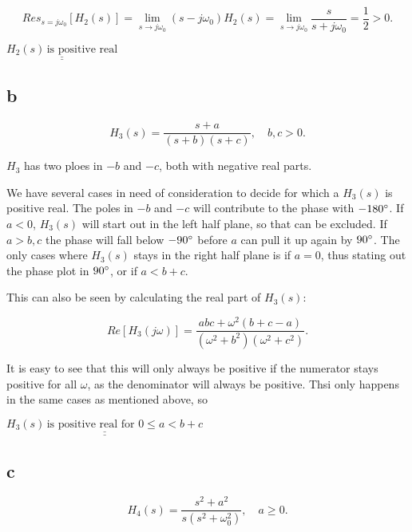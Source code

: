 \documentclass{article}
\begin{document}
\begin{equation*}
    Res_{s = j\omega_0}[H_2(s)] = \lim_{s\to j\omega_0}(s - j\omega_0)H_2(s) = \lim_{s\to j\omega_0}\frac{s}{s + j\omega_0} = \frac{1}{2} > 0.
\end{equation*}

$\underline{\underline{H_2(s) \, \textrm{is positive real}}}$


\subsection*{b}

\begin{equation*}
    H_3(s) = \frac{s+a}{(s + b)(s + c)}, \quad b, c > 0.
\end{equation*}

$H_3$ has two ploes in $-b$ and $-c$, both with negative real parts. 

We have several cases in need of consideration to decide for which a $H_3(s)$ is positive real. The poles in $-b$ and $-c$ will contribute to the phase with $-180 \degree$. If $a < 0$, $H_3(s)$ will start out in the left half plane, so that can be excluded. If $a > b,c$ the phase will fall below $-90 \degree$ before $a$ can pull it up again by $90\degree$. The only cases where $H_3(s)$ stays in the right half plane is if $a = 0$, thus stating out the phase plot in $90\degree$, or if $a < b + c$. 

This can also be seen by calculating the real part of $H_3(s)$:

\begin{equation*}
    Re[H_3(j\omega)] = \frac{abc + \omega^2(b+c-a)}{(\omega^2 + b^2)(\omega^2 + c^2)}.
\end{equation*}


It is easy to see that this will only always be positive if the numerator stays positive for all $\omega$, as the denominator will always be positive. Thsi only happens in the same cases as mentioned above, so

$\underline{\underline{H_3(s) \, \textrm{is positive real for } 0 \leq a < b + c}}$

\subsection*{c}

\begin{equation*}
    H_4(s) = \frac{s^2 + a^2}{s(s^2 + \omega_0^2)}, \quad a \geq 0.
\end{equation*}
\end{document}
